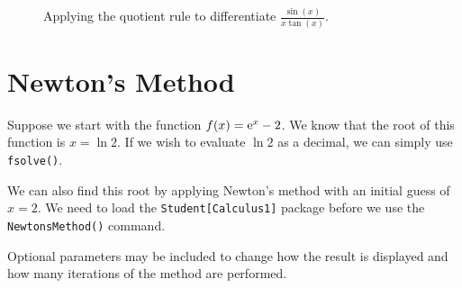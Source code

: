 \clearpage

\begin{figure}[h]
\caption{Applying the quotient rule to differentiate $\frac{\sin(x)}{x\tan(x)}$.}
\centering
{}
\end{figure}

\section{Newton's Method}
\label{sec:newtonsmethod}

Suppose we start with the function $f(x) = {\rm e}^x - 2$. We know that the root of this function is $x = \ln 2$. If we wish to evaluate $\ln 2$ as a decimal, we can simply use \texttt{fsolve()}.



\begin{maplegroup}
\begin{mapleinput}
\end{mapleinput}
\mapleresult
\begin{maplelatex}
\end{maplelatex}
\end{maplegroup}

\begin{maplegroup}
\begin{mapleinput}
\end{mapleinput}
\mapleresult
\begin{maplelatex}
\end{maplelatex}
\end{maplegroup}

We can also find this root by applying Newton's method with an initial guess of $x=2$. We need to load the \texttt{Student[Calculus1]} package before we use the \texttt{NewtonsMethod()} command. 

Optional parameters may be included to change how the result is displayed and how many iterations of the method are performed.


